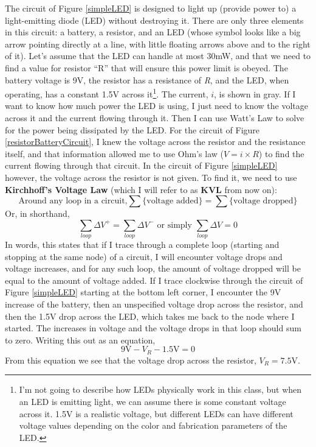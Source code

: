 The circuit of Figure \ref{simpleLED} is designed to light up (provide power to) a light-emitting diode (LED) without destroying it. There are only three elements in this circuit: a battery, a resistor, and an LED (whose symbol looks like a big arrow pointing directly at a line, with little floating arrows above and to the right of it). Let's assume that the LED can handle at most 30mW, and that we need to find a value for resistor ``R'' that will ensure this power limit is obeyed. The battery voltage is 9V, the resistor has a resistance of \textit{R}, and the LED, when operating, has a constant 1.5V across it\footnote{I'm not going to describe how LEDs physically work in this class, but when an LED is emitting light, we can assume there is some constant voltage across it. 1.5V is a realistic voltage, but different LEDs can have different voltage values depending on the color and fabrication parameters of the LED.}. The current, $i$, is shown in gray.  If I want to know how much power the LED is using, I just need to know the voltage across it and the current flowing through it. Then I can use Watt's Law to solve for the power being dissipated by the LED. For the circuit of Figure \ref{resistorBatteryCircuit}, I knew the voltage across the resistor and the resistance itself, and that information allowed me to use Ohm's law ($V=i \times R$) to find the current flowing through that circuit. In the circuit of Figure \ref{simpleLED} however, the voltage across the resistor is not given. To find it, we need to use \textbf{Kirchhoff's Voltage Law} (which I will refer to as \textbf{KVL} from now on):
$$
\textrm{Around any loop in a circuit,} \sum\textrm{\{voltage added\}} = \sum\textrm{\{voltage dropped\}}
$$
Or, in shorthand, 
$$
\sum_{loop}\Delta V^+ = \sum_{loop}\Delta V^- \textrm{  or simply }\sum_{loop}\Delta V = 0
$$
In words, this states that if I trace through a complete loop (starting and stopping at the same node) of a circuit, I will encounter voltage drops and voltage increases, and for any such loop, the amount of voltage dropped will be equal to the amount of voltage added. If I trace clockwise through the circuit of Figure \ref{simpleLED} starting at the bottom left corner, I encounter the 9V increase of the battery, then an unspecified voltage drop across the resistor, and then the 1.5V drop across the LED, which takes me back to the node where I started. The increases in voltage and the voltage drops in that loop should sum to zero. Writing this out as an equation,
$$
9\textrm{V} - V_R - 1.5\textrm{V} = 0
$$
From this equation we see that the voltage drop across the resistor, $V_R = 7.5\textrm{V}$.
